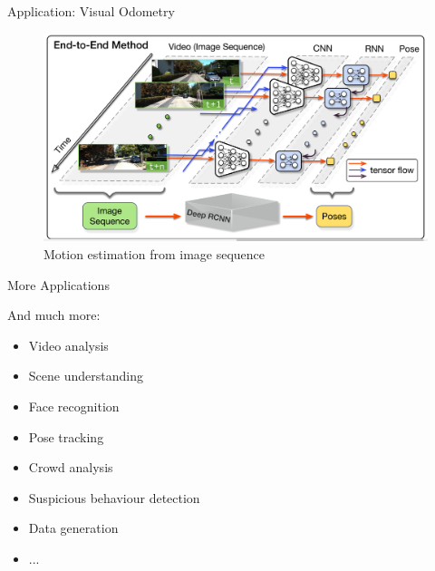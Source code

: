 \begin{frame}{Application: Visual Odometry}

	\begin{figure}
		\includegraphics[width=0.9\linewidth]{images/deepvo.png}
		\caption{Motion estimation from image sequence}
	\end{figure}
		
	\cite{DEEPVO}
\end{frame}

\begin{frame}{More Applications}

	And much more:
	\begin{itemize}
		\item Video analysis
		\item Scene understanding
		\item Face recognition
		\item Pose tracking
		\item Crowd analysis
		\item Suspicious behaviour detection
		\item Data generation
		\item ...
	\end{itemize}
	
\end{frame}







